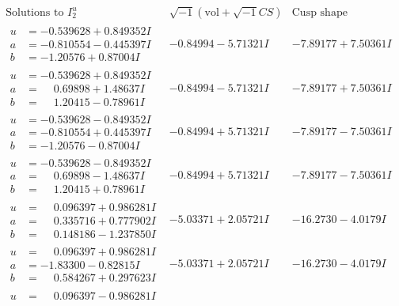 \documentclass[1p]{elsarticle_modified}
\theoremstyle{definition}
\newcommand{\I}{\sqrt{-1}}
\begin{document}
$$\begin{array}{c|c|c}  
\text{Solutions to }I^u_{2}& \I (\text{vol} + \sqrt{-1}CS) & \text{Cusp shape}\\
 \hline 
\begin{aligned}
u &= -0.539628 + 0.849352 I \\
a &= -0.810554 - 0.445397 I \\
b &= -1.20576 + 0.87004 I\end{aligned}
 & -0.84994 - 5.71321 I & -7.89177 + 7.50361 I \\ \hline\begin{aligned}
u &= -0.539628 + 0.849352 I \\
a &= \phantom{-}0.69898 + 1.48637 I \\
b &= \phantom{-}1.20415 - 0.78961 I\end{aligned}
 & -0.84994 - 5.71321 I & -7.89177 + 7.50361 I \\ \hline\begin{aligned}
u &= -0.539628 - 0.849352 I \\
a &= -0.810554 + 0.445397 I \\
b &= -1.20576 - 0.87004 I\end{aligned}
 & -0.84994 + 5.71321 I & -7.89177 - 7.50361 I \\ \hline\begin{aligned}
u &= -0.539628 - 0.849352 I \\
a &= \phantom{-}0.69898 - 1.48637 I \\
b &= \phantom{-}1.20415 + 0.78961 I\end{aligned}
 & -0.84994 + 5.71321 I & -7.89177 - 7.50361 I \\ \hline\begin{aligned}
u &= \phantom{-}0.096397 + 0.986281 I \\
a &= \phantom{-}0.335716 + 0.777902 I \\
b &= \phantom{-}0.148186 - 1.237850 I\end{aligned}
 & -5.03371 + 2.05721 I & -16.2730 - 4.0179 I \\ \hline\begin{aligned}
u &= \phantom{-}0.096397 + 0.986281 I \\
a &= -1.83300 - 0.82815 I \\
b &= \phantom{-}0.584267 + 0.297623 I\end{aligned}
 & -5.03371 + 2.05721 I & -16.2730 - 4.0179 I \\ \hline\begin{aligned}
u &= \phantom{-}0.096397 - 0.986281 I \\

\end{aligned}
\end{array}$$
\end{document}
